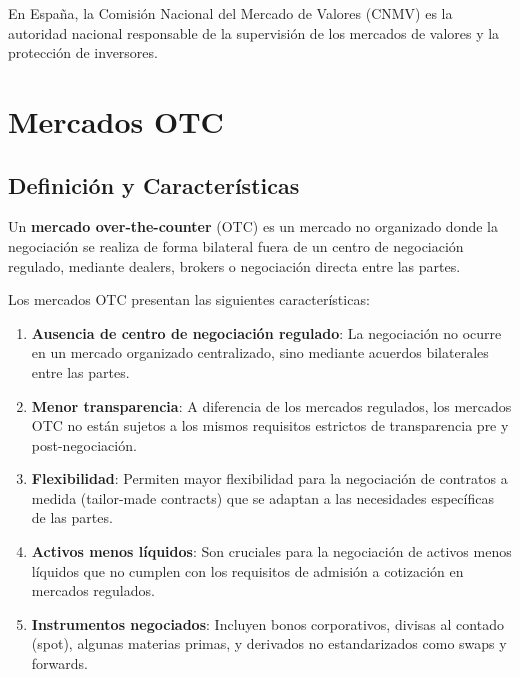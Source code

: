 En España, la Comisión Nacional del Mercado de Valores (CNMV) es la autoridad nacional responsable de la supervisión de los mercados de valores y la protección de inversores.

\section{Mercados OTC}

\subsection{Definición y Características}

\begin{definicion}
Un \textbf{mercado over-the-counter} (OTC) es un mercado no organizado donde la negociación se realiza de forma bilateral fuera de un centro de negociación regulado, mediante dealers, brokers o negociación directa entre las partes.
\end{definicion}

\begin{teorema}
Los mercados OTC presentan las siguientes características:

\begin{enumerate}
\item \textbf{Ausencia de centro de negociación regulado}: La negociación no ocurre en un mercado organizado centralizado, sino mediante acuerdos bilaterales entre las partes.

\item \textbf{Menor transparencia}: A diferencia de los mercados regulados, los mercados OTC no están sujetos a los mismos requisitos estrictos de transparencia pre y post-negociación.

\item \textbf{Flexibilidad}: Permiten mayor flexibilidad para la negociación de contratos a medida (tailor-made contracts) que se adaptan a las necesidades específicas de las partes.

\item \textbf{Activos menos líquidos}: Son cruciales para la negociación de activos menos líquidos que no cumplen con los requisitos de admisión a cotización en mercados regulados.

\item \textbf{Instrumentos negociados}: Incluyen bonos corporativos, divisas al contado (spot), algunas materias primas, y derivados no estandarizados como swaps y forwards.
\end{enumerate}
\end{teorema}

